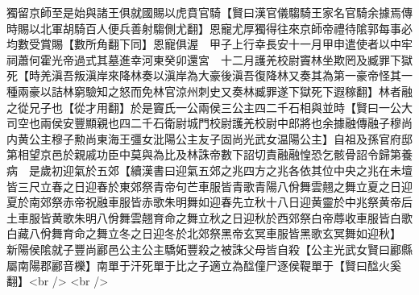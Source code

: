 獨留京師至是始與諸王俱就國賜以虎賁官騎【賢曰漢官儀騶騎王家名官騎余據焉傳時賜以北軍胡騎百人便兵善射騶側尤翻】恩寵尤厚獨得往來京師帝禮待隂郭每事必均數受賞賜【數所角翻下同】恩寵俱渥　甲子上行幸長安十一月甲申遣使者以中牢祠蕭何霍光帝過式其墓進幸河東癸卯還宮　十二月護羌校尉竇林坐欺罔及臧罪下獄死【時羌滇吾叛滇岸來降林奏以滇岸為大豪後滇吾復降林又奏其為第一豪帝怪其一種兩豪以詰林窮驗知之怒而免林官涼州刺史又奏林臧罪遂下獄死下遐稼翻】林者融之從兄子也【從才用翻】於是竇氏一公兩侯三公主四二千石相與並時【賢曰一公大司空也兩侯安豐顯親也四二千石衛尉城門校尉護羌校尉中郎將也余據融傳融子穆尚内黄公主穆子勲尚東海王彊女沘陽公主友子固尚光武女温陽公主】自祖及孫官府邸第相望京邑於親戚功臣中莫與為比及林誅帝數下詔切責融融惶恐乞骸骨詔令歸第養病　是歲初迎氣於五郊【續漢書曰迎氣五郊之兆四方之兆各依其位中央之兆在未壇皆三尺立春之日迎春於東郊祭青帝句芒車服皆青歌青陽八佾舞雲翹之舞立夏之日迎夏於南郊祭赤帝祝融車服皆赤歌朱明舞如迎春先立秋十八日迎黄靈於中兆祭黄帝后土車服皆黄歌朱明八佾舞雲翹育命之舞立秋之日迎秋於西郊祭白帝蓐收車服皆白歌白藏八佾舞育命之舞立冬之日迎冬於北郊祭黑帝玄冥車服皆黑歌玄冥舞如迎秋】　新陽侯隂就子豐尚酈邑公主公主驕妬豐殺之被誅父母皆自殺【公主光武女賢曰酈縣屬南陽郡酈音櫟】南單于汗死單于比之子適立為䤈僮尸逐侯鞮單于【賢曰䤈火奚翻】<br />
<br />
